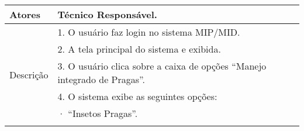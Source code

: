 \begin{table}[!h]
\begin{tabular}{|l|l|}
Atores                                                   & Técnico Responsável.                                                                                                                                                                                                                                                                                                                                                                     \\ \hline
\multirow{8}{*}{Descrição}                               & 1. O usuário faz login no sistema MIP/MID.                                                                                                                                                                                                                                                                                                                                               \\ \cline{2-2} 
                                                         & 2. A tela principal do sistema e exibida.                                                                                                                                                                                                                                                                                                                                                \\ \cline{2-2} 
                                                         & 3. O usuário clica sobre a caixa de opções “Manejo integrado de Pragas”.                                                                                                                                                                                                                                                                                                                 \\ \cline{2-2} 
                                                         & 4. O sistema exibe as seguintes opções:                                                                                                                                                                                                                                                                                                                                                  \\ \cline{2-2} 
                                                         & ·         “Insetos Pragas”.                                                                                                                                                                                                                                                                                                                                                              \\ \cline{2-2} 

\end{tabular}
\end{table}

